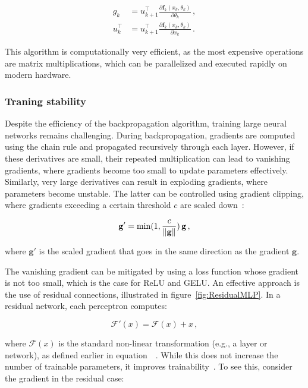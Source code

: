 \begin{align}
\label{eq:backprop_backwardpass}
	g_k & = u_{k+1}^{\intercal} \frac{\partial \mathbf{f}_k(x_k, \theta_k)}{\partial \theta_k} \,,\\
	u_k^{\intercal} & = u_{k+1}^{\intercal} \frac{\partial \mathbf{f}_k(x_k, \theta_k)}{\partial x_k} \,. 
\end{align}

This algorithm is computationally very efficient, as the most expensive operations are matrix multiplications, which can be parallelized and executed rapidly on modern hardware. 


\subsubsection{Traning stability}
Despite the efficiency of the backpropagation algorithm, training large neural networks remains challenging. During backpropagation, gradients are computed using the chain rule and propagated recursively through each layer.
However, if these derivatives are small, their repeated multiplication can lead to vanishing gradients, where gradients become too small to update parameters effectively. Similarly, very large derivatives can result in exploding gradients, where parameters become unstable. 
The latter can be controlled using gradient clipping, where gradients exceeding a certain threshold $c$ are scaled down~\cite{murphy_probabilistic_2022}:

\begin{equation}
\label{eq:gradient_clipping}
    \mathbf{g}' = \min(1, \frac{c}{\norm{\mathbf{g}}}) \, \mathbf{g} \,,
\end{equation}

\noindent where $\mathbf{g}'$ is the scaled gradient that goes in the same direction as the gradient $\mathbf{g}$.


The vanishing gradient can be mitigated by using a loss function whose gradient is not too small, which is the case for ReLU and GELU.  
An effective approach is the use of residual connections, illustrated in figure~\ref{fig:ResidualMLP}. In a residual network, each perceptron computes:

\begin{equation}
\label{eq:residual_layer}
	\mathcal{F'}(x) = \mathcal{F}(x) + x\,,
\end{equation}

\noindent where $\mathcal{F}(x)$ is the standard non-linear transformation (e.g., a layer or network), as defined earlier in equation~~\cite{he_deep_2015}. While this does not increase the number of trainable parameters, it improves trainability~\cite{murphy_probabilistic_2022}. 
To see this, consider the gradient in the residual case:

